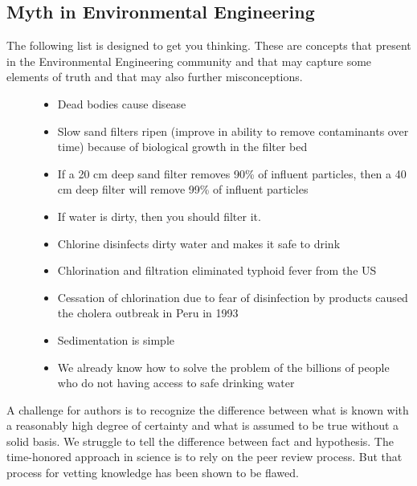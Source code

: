 \documentclass[letterpaper,10pt,english]{sphinxmanual}
\begin{document}
\subsection{Myth in Environmental Engineering}
\label{\detokenize{Introduction/Introduction:myth-in-environmental-engineering}}\label{\detokenize{Introduction/Introduction:heading-myth-in-environmental-engineering}}\begin{description}
\item[{The following list is designed to get you thinking. These are concepts that present in the Environmental Engineering community and that may capture some elements of truth and that may also further misconceptions.}] \leavevmode\begin{itemize}
\item {} 
Dead bodies cause disease

\item {} 
Slow sand filters ripen (improve in ability to remove contaminants over time) because of biological growth in the filter bed

\item {} 
If a 20 cm deep sand filter removes 90\% of influent particles, then a 40 cm deep filter will remove 99\% of influent particles

\item {} 
If water is dirty, then you should filter it.

\item {} 
Chlorine disinfects dirty water and makes it safe to drink

\item {} 
Chlorination and filtration eliminated typhoid fever from the US

\item {} 
Cessation of chlorination due to fear of disinfection by products caused the cholera outbreak in Peru in 1993

\item {} 
Sedimentation is simple

\item {} 
We already know how to solve the problem of the billions of people who do not having access to safe drinking water

\end{itemize}

\end{description}

A challenge for authors is to recognize the difference between what is known with a reasonably high degree of certainty and what is assumed to be true without a solid basis. We struggle to tell the difference between fact and hypothesis. The time-honored approach in science is to rely on the peer review process. But that process for vetting knowledge has been shown to be flawed.
\end{document}
